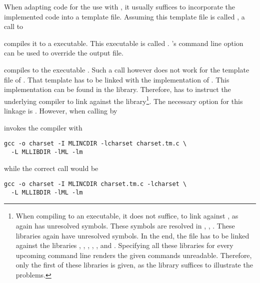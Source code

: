 When adapting \C code for the use with \MathLink, it usually suffices to incorporate the implemented \C code into a template file. Assuming this template file is called , a call to


compiles it to a \MathLink executable. This executable is called . \Mcc's command line option  can be used to override the output file.


compiles  to the executable . Such a call however does not work for the  \MathLink template file of . That \MathLink template has to be linked with the implementation of \exportedsymbol. This implementation can be found in the \LibCharSet library. Therefore, \Mcc has to instruct the underlying compiler to link against the \LibCharSet library\footnote{When compiling to an executable, it does not suffice, to link against \LibCharSet, as \LibCharSet again has unresolved symbols. These symbols are resolved in \LibExtIO, \LibAlgebra, \LibAldor. These libraries again have unresolved symbols. In the end, the \MathLink file has to be linked against the libraries \LibCharSet, \LibExtIO, \LibAlgebra, \LibAldor, \LibFoam, and \LibM. Specifying all these libraries for every upcoming command line renders the given commands unreadable. Therefore, only the first of these libraries is given, as the \LibCharSet library suffices to illustrate the problems.}. The necessary option for this linkage is . However, when calling \Mcc by


\Mcc invokes the \C compiler with

\begin{verbatim}
gcc -o charset -I MLINCDIR -lcharset charset.tm.c \
  -L MLLIBDIR -lML -lm
\end{verbatim}

while the correct call would be 

\begin{verbatim}
gcc -o charset -I MLINCDIR charset.tm.c -lcharset \
  -L MLLIBDIR -lML -lm
\end{verbatim}

